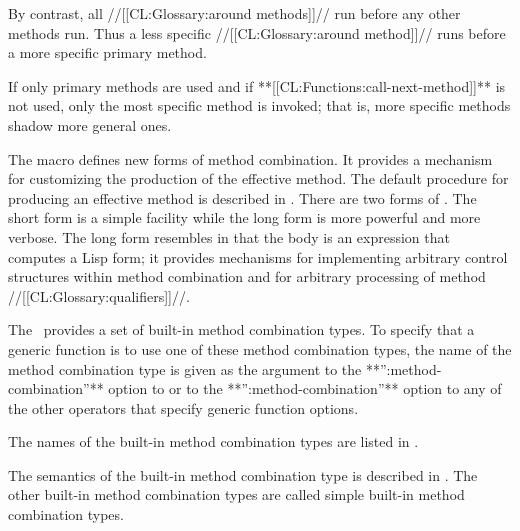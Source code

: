 By contrast, all //[[CL:Glossary:around methods]]// run before any other methods run.  Thus a less specific //[[CL:Glossary:around method]]// runs before a more specific primary method.

If only primary methods are used and if **[[CL:Functions:call-next-method]]** is not used, only the most specific method is invoked; that is, more specific methods shadow more general ones. 

\endsubsubsection%

            The macro  defines new forms of method combination.  It provides a mechanism for customizing the production of the effective method. The default procedure for producing an effective method is described in \secref\DeterminingtheEffectiveMethod. There are two forms of .  The short form is a simple facility while the long form is more powerful and more verbose.  The long form resembles  in that the body is an expression that computes a Lisp form; it provides mechanisms for implementing arbitrary control structures within method combination and for arbitrary processing of method //[[CL:Glossary:qualifiers]]//.  

\endsubsubsection%

 

The \CLOS\ provides a set of built-in method combination types.  To specify that a generic function is to use one of these method combination types, the name of the method combination type is given as the argument to the **'':method-combination''** option to   or to the **'':method-combination''** option to any of the other operators that specify generic function options.

The names of the built-in  method combination types are listed in \thenextfigure. \idxref{+}%


The semantics of the  built-in method combination type is described in \secref\StdMethComb.  The other built-in method combination types are called simple built-in method combination types.

